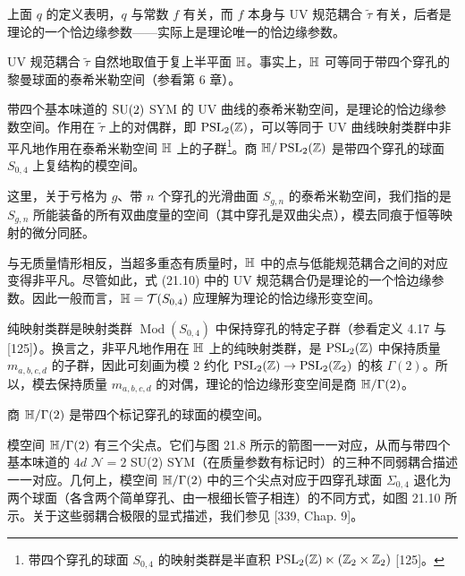 
\begin{remark}[21.20] 上面 $q$ 的定义表明，$q$ 与常数 $f$ 有关，而 $f$ 本身与 UV 规范耦合 $\tilde\tau$ 有关，后者是理论的一个恰边缘参数——实际上是理论唯一的恰边缘参数。\end{remark}

UV 规范耦合 $\tilde\tau$ 自然地取值于复上半平面 $\mathbb{H}$。事实上，$\mathbb{H}$ 可等同于带四个穿孔的黎曼球面的泰希米勒空间（参看第 6 章）。

\begin{proposition}[21.21] 带四个基本味道的 $\operatorname{SU}(2)$ SYM 的 UV 曲线的泰希米勒空间，是理论的恰边缘参数空间。作用在 $\tilde\tau$ 上的对偶群，即 $\operatorname{PSL}_2(\mathbb{Z})$，可以等同于 UV 曲线映射类群中非平凡地作用在泰希米勒空间 $\mathbb{H}$ 上的子群\footnote{带四个穿孔的球面 $S_{0,4}$ 的映射类群是半直积 $\operatorname{PSL}_2(\mathbb{Z})\ltimes(\mathbb{Z}_2\times\mathbb{Z}_2)$ [125]。}。商 $\mathbb{H}/\operatorname{PSL}_2(\mathbb{Z})$ 是带四个穿孔的球面 $S_{0,4}$ 上复结构的模空间。\end{proposition}

\begin{remark}[21.22] 这里，关于亏格为 $g$、带 $n$ 个穿孔的光滑曲面 $S_{g,n}$ 的泰希米勒空间，我们指的是 $S_{g,n}$ 所能装备的所有双曲度量的空间（其中穿孔是双曲尖点），模去同痕于恒等映射的微分同胚。\end{remark}

与无质量情形相反，当超多重态有质量时，$\mathbb{H}$ 中的点与低能规范耦合之间的对应变得非平凡。尽管如此，式 (21.10) 中的 UV 规范耦合仍是理论的一个恰边缘参数。因此一般而言，$\mathbb{H}=\mathcal{T}(S_{0,4})$ 应理解为理论的恰边缘形变空间。

纯映射类群是映射类群 $\operatorname{Mod}(S_{0,4})$ 中保持穿孔的特定子群（参看定义 4.17 与 [125]）。换言之，非平凡地作用在 $\mathbb{H}$ 上的纯映射类群，是 $\operatorname{PSL}_2(\mathbb{Z})$ 中保持质量 $m_{a,b,c,d}$ 的子群，因此可刻画为模 2 约化 $\operatorname{PSL}_2(\mathbb{Z})\to\operatorname{PSL}_2(\mathbb{Z}_2)$ 的核 $\Gamma(2)$。所以，模去保持质量 $m_{a,b,c,d}$ 的对偶，理论的恰边缘形变空间是商 $\mathbb{H}/\Gamma(2)$。

\begin{remark}[21.23] 商 $\mathbb{H}/\Gamma(2)$ 是带四个标记穿孔的球面的模空间。\end{remark}

模空间 $\mathbb{H}/\Gamma(2)$ 有三个尖点。它们与图 21.8 所示的箭图一一对应，从而与带四个基本味道的 $4d$ $\mathcal{N}=2$ SU(2) SYM（在质量参数有标记时）的三种不同弱耦合描述一一对应。几何上，模空间 $\mathbb{H}/\Gamma(2)$ 中的三个尖点对应于四穿孔球面 $\Sigma_{0,4}$ 退化为两个球面（各含两个简单穿孔、由一根细长管子相连）的不同方式，如图 21.10 所示。关于这些弱耦合极限的显式描述，我们参见 [339, Chap. 9]。

